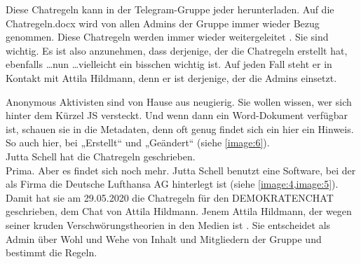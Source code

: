 Diese Chatregeln kann in der Telegram-Gruppe jeder herunterladen. Auf die Chatregeln.docx wird von allen Admins der Gruppe immer wieder Bezug genommen. Diese Chatregeln werden immer wieder weitergeleitet \autocite{Telegram:demokratenchat3:regeln}. Sie sind wichtig. Es ist also anzunehmen, dass derjenige, der die Chatregeln erstellt hat, ebenfalls \dots nun \dots vielleicht ein bisschen wichtig ist. Auf jeden Fall steht er in Kontakt mit Attila Hildmann, denn er ist derjenige, der die Admins einsetzt.

Anonymous Aktivisten sind von Hause aus neugierig. Sie wollen wissen, wer sich hinter dem Kürzel JS versteckt. Und wenn dann ein Word-Dokument verfügbar ist, schauen sie in die Metadaten, denn oft genug findet sich ein hier ein Hinweis. So auch hier, bei „Erstellt“ und „Geändert“ (siehe \cref{image:6}).\\

Jutta Schell hat die Chatregeln geschrieben.\\

Prima. Aber es findet sich noch mehr. Jutta Schell benutzt eine Software, bei der als Firma die Deutsche Lufthansa AG hinterlegt ist (siehe \cref{image:4,image:5}). Damit hat sie am 29.05.2020 die Chatregeln für den DEMOKRATENCHAT geschrieben, dem Chat von Attila Hildmann. Jenem Attila Hildmann, der wegen seiner kruden Verschwörungstheorien in den Medien ist \autocite{3}\autocite{4}\autocite{5}\autocite{6}\autocite{7}.
Sie entscheidet als Admin über Wohl und Wehe von Inhalt und Mitgliedern der Gruppe und bestimmt die Regeln.
\begin{figure}\centering
  \caption{}
\end{figure}

\newpage
